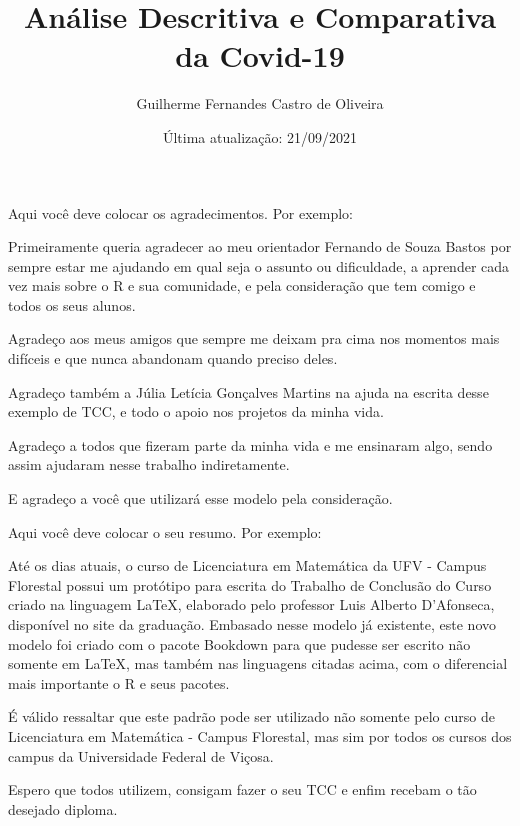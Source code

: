 \documentclass[
  fleqn,ebook]{ic}
\title{Análise Descritiva e Comparativa da Covid-19}
\author{Guilherme Fernandes Castro de Oliveira}
\date{Última atualização: 21/09/2021}
\renewcommand\maketitle{}
\begin{document}
\maketitle

\begin{acknowledgement}

  Aqui você deve colocar os agradecimentos. Por exemplo:
  
  Primeiramente queria agradecer ao meu orientador Fernando de Souza Bastos por
  sempre estar me ajudando em qual seja o assunto ou dificuldade, a aprender
  cada vez mais sobre o R e sua comunidade, e pela consideração que tem comigo e
  todos os seus alunos.
  
  Agradeço aos meus amigos que sempre me deixam pra cima nos momentos mais
  difíceis e que nunca abandonam quando preciso deles.

  Agradeço também a Júlia Letícia Gonçalves Martins na ajuda na escrita desse
  exemplo de TCC, e todo o apoio nos projetos da minha vida.
  
  Agradeço a todos que fizeram parte da minha vida e me ensinaram algo, sendo
  assim ajudaram nesse trabalho indiretamente.
  
  E agradeço a você que utilizará esse modelo pela consideração.

\end{acknowledgement}
\begin{Resumo}
  
  Aqui você deve colocar o seu resumo. Por exemplo:
  
  Até os dias atuais, o curso de Licenciatura em Matemática da UFV - Campus 
  Florestal possui um protótipo para escrita do Trabalho de Conclusão do Curso
  criado na linguagem LaTeX, elaborado pelo professor Luis Alberto D'Afonseca, 
  disponível no site da graduação. Embasado nesse modelo já existente, este novo
  modelo foi criado com o pacote Bookdown para que pudesse ser escrito não 
  somente em LaTeX, mas também nas linguagens citadas acima, com o diferencial 
  mais importante o R e seus pacotes.
  
  É válido ressaltar que este padrão pode ser utilizado não somente pelo curso
  de Licenciatura em Matemática - Campus Florestal, mas sim por todos os cursos
  dos campus da Universidade Federal de Viçosa.
  
  Espero que todos utilizem, consigam fazer o seu TCC e enfim recebam o tão
  desejado diploma.
  
\end{Resumo}
\end{document}
